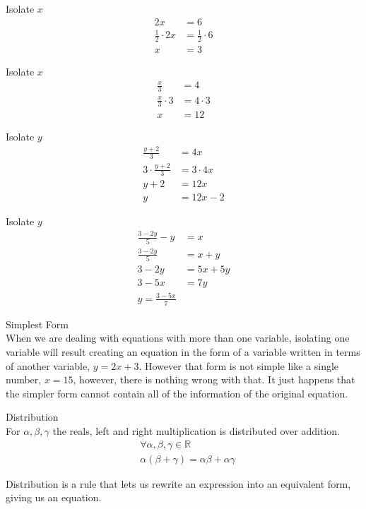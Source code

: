 \documentclass{book}
\begin{document}
  {\example Isolate $x$ \\
    \begin{align*}
      2x & = 6\\
      \frac{1}{2} \cdot 2x & = \frac{1}{2} \cdot 6\\
      x & = 3
    \end{align*}
  }

  {\example Isolate $x$ \\
    \begin{align*}
      \frac{x}{3} & = 4\\
      \frac{x}{3} \cdot 3 & = 4 \cdot 3\\
      x & = 12
    \end{align*}
  }

  {\example Isolate $y$ \\
    \begin{align*}
      \frac{y + 2}{3} & = 4x\\
      3 \cdot \frac{y + 2}{3} & = 3 \cdot 4x\\
      y + 2 & = 12x\\
      y & = 12x - 2
    \end{align*}
  }

  {\example Isolate $y$ \\
    \begin{align*}
      \frac{3 - 2y}{5} - y & = x\\
      \frac{3 - 2y}{5} & = x + y\\
      3 - 2y & = 5x + 5y\\
      3 - 5x & = 7y\\
      y = \frac{3 - 5x}{7}
    \end{align*}
  }

  {\remark Simplest Form \\
    When we are dealing with equations with more than one variable, isolating one variable will result creating an equation in the form of a variable written in terms of another variable, $y = 2x + 3$. However that form is not simple like a single number, $x = 15$, however, there is nothing wrong with that. It just happens that the simpler form cannot contain all of the information of the original equation.\\
  }

  {\axiom Distribution \\
    For $\alpha, \beta, \gamma$ the reals, left and right multiplication is distributed over addition.
    \begin{align*}
      & \forall \alpha, \beta, \gamma \in \mathbb{R}\\
      & \alpha (\beta + \gamma) = \alpha \beta + \alpha \gamma
    \end{align*}

    Distribution is a rule that lets us rewrite an expression into an equivalent form, giving us an equation.\\
  }
\end{document}
